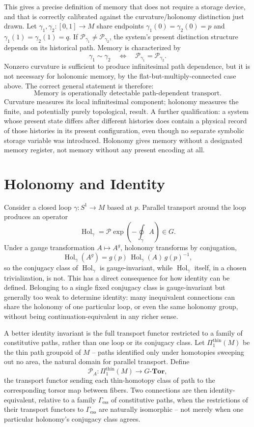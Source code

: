 \documentclass[11pt]{article}
\newcommand{\Hol}{\operatorname{Hol}}
\begin{document}
This gives a precise definition of memory that does not require a storage device, and that is correctly calibrated against the curvature/holonomy distinction just drawn. Let $\gamma_1, \gamma_2 : [0,1] \rightarrow M$ share endpoints $\gamma_1(0) = \gamma_2(0) = p$ and $\gamma_1(1) = \gamma_2(1) = q$. If $\mathcal{P}_{\gamma_1} \neq \mathcal{P}_{\gamma_2}$, the system's present distinction structure depends on its historical path. Memory is characterized by
\[
\gamma_1 \sim \gamma_2 \quad \Longleftrightarrow \quad \mathcal{P}_{\gamma_1} = \mathcal{P}_{\gamma_2}.
\]
Nonzero curvature is sufficient to produce infinitesimal path dependence, but it is not necessary for holonomic memory, by the flat-but-multiply-connected case above. The correct general statement is therefore:
\[
\text{Memory is operationally detectable path-dependent transport.}
\]
Curvature measures its local infinitesimal component; holonomy measures the finite, and potentially purely topological, result. A further qualification: a system whose present state differs after different histories does contain a physical record of those histories in its present configuration, even though no separate symbolic storage variable was introduced. Holonomy gives memory without a designated memory register, not memory without any present encoding at all.

\section{Holonomy and Identity}

Consider a closed loop $\gamma : S^1 \rightarrow M$ based at $p$. Parallel transport around the loop produces an operator
\[
\Hol_\gamma = \mathcal{P}\exp\left(-\oint_\gamma A\right) \in G.
\]
Under a gauge transformation $A \mapsto A^g$, holonomy transforms by conjugation,
\[
\Hol_\gamma(A^g) = g(p)\, \Hol_\gamma(A)\, g(p)^{-1},
\]
so the conjugacy class of $\Hol_\gamma$ is gauge-invariant, while $\Hol_\gamma$ itself, in a chosen trivialization, is not. This has a direct consequence for how identity can be defined. Belonging to a single fixed conjugacy class is gauge-invariant but generally too weak to determine identity: many inequivalent connections can share the holonomy of one particular loop, or even the same holonomy group, without being continuation-equivalent in any richer sense.

A better identity invariant is the full transport functor restricted to a family of constitutive paths, rather than one loop or its conjugacy class. Let $\Pi_1^{\mathrm{thin}}(M)$ be the thin path groupoid of $M$ -- paths identified only under homotopies sweeping out no area, the natural domain for parallel transport. Define
\[
\mathcal{P}_A : \Pi_1^{\mathrm{thin}}(M) \longrightarrow G\text{-}\mathbf{Tor},
\]
the transport functor sending each thin-homotopy class of path to the corresponding torsor map between fibers. Two connections are then identity-equivalent, relative to a family $\Gamma_{\mathrm{ess}}$ of constitutive paths, when the restrictions of their transport functors to $\Gamma_{\mathrm{ess}}$ are naturally isomorphic -- not merely when one particular holonomy's conjugacy class agrees.
\end{document}

